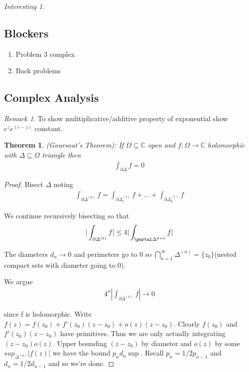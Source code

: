 \documentclass[11pt]{article}
\newcommand{\C}{\mathbb{C}}
\newtheorem{theorem}{Theorem}
\theoremstyle{remark}
\newtheorem{remark}{Remark}
\newtheorem{interest}{Interesting}
\begin{document}
\begin{interest}
\subsection{Blockers}

\begin{enumerate}
	\item Problem 3 complex
	\item Back problems
\end{enumerate}
	
\subsection{Complex Analysis}

\begin{remark}
	To show mulitiplicative/additive property of exponential show $e^ze^(c-z)$ constant.
\end{remark}

\begin{theorem}
	(Goursout's Theorem): If $\Omega \subseteq \C$ open and $f : \Omega \to \C$ holomorphic with $\Delta \subseteq \Omega$ triangle then 
	\begin{align*}
		\int_{\partial \Delta} f = 0
	\end{align*}
\end{theorem}

\begin{proof}
	Bisect $\Delta$ noting
	\begin{align*}
		\int_{\partial \Delta^{(0)}} f = \int_{\partial \Delta^{(1)}_1} f + ... + \int_{\partial \Delta^{(1)}_4} f
	\end{align*}

	We continue recursively bisecting so that
	\begin{align*}
		|\int_{\partial \Delta^{(k)}} f| \leq 4 |\int_{\partal \Delta^{k+1}} f|
	\end{align*}

	The diameters $d_n \to 0$ and perimeters go to 0 so $\bigcap_{n=1}^{\infty} \Delta^{(n)} = \{z_0\}$(nested compact sets with diameter going to 0).

	We argue
	\begin{align*}
		4^n |\int_{\partial \Delta^{(n)}} f| \to 0
	\end{align*}

	since f is holomorphic. Write $f(z) = f(z_0) + f'(z_0)(z-z_0) + o(z)(z-z_0)$. Clearly $f(z_0)$ and $f'(z_0)(z-z_0)$ have primitives. Thus we are only actually integrating $(z-z_0)o(z)$. Upper bounding $(z-z_0)$ by diameter and $o(z)$ by some $sup_{\Delta^{(n)}} |f(z)|$ we have the bound $p_n d_n \sup$. Recall $p_n = 1/2p_{n-1}$ and $d_n = 1/2 d_{n-1}$ and so we're done.
\end{proof}


\end{interest}
\end{document}
